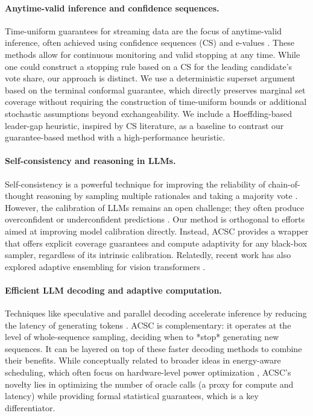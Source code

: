 \documentclass[11pt]{article}
\begin{document}
\paragraph{Anytime-valid inference and confidence sequences.}
Time-uniform guarantees for streaming data are the focus of anytime-valid inference, often achieved using confidence sequences (CS) and e-values \cite{howard2021time, waudbysmith2020confidence, grunwald2019safe}. These methods allow for continuous monitoring and valid stopping at any time. While one could construct a stopping rule based on a CS for the leading candidate's vote share, our approach is distinct. We use a deterministic superset argument based on the terminal conformal guarantee, which directly preserves marginal set coverage without requiring the construction of time-uniform bounds or additional stochastic assumptions beyond exchangeability. We include a Hoeffding-based leader-gap heuristic, inspired by CS literature, as a baseline to contrast our guarantee-based method with a high-performance heuristic.

\paragraph{Self-consistency and reasoning in LLMs.}
Self-consistency is a powerful technique for improving the reliability of chain-of-thought reasoning by sampling multiple rationales and taking a majority vote \cite{wang2023selfconsistency, kojima2022zeroshot}. However, the calibration of LLMs remains an open challenge; they often produce overconfident or underconfident predictions \cite{guo2017calibration, kadavath2022know, jain2024measuring, zhao2021calibrate}. Our method is orthogonal to efforts aimed at improving model calibration directly. Instead, ACSC provides a wrapper that offers explicit coverage guarantees and compute adaptivity for any black-box sampler, regardless of its intrinsic calibration. Relatedly, recent work has also explored adaptive ensembling for vision transformers \cite{bolya2022hydra}.

\paragraph{Efficient LLM decoding and adaptive computation.}
Techniques like speculative and parallel decoding accelerate inference by reducing the latency of generating tokens \cite{leviathan2023fast, chen2023medusa}. ACSC is complementary: it operates at the level of whole-sequence sampling, deciding when to *stop* generating new sequences. It can be layered on top of these faster decoding methods to combine their benefits. While conceptually related to broader ideas in energy-aware scheduling, which often focus on hardware-level power optimization \cite{valentini2007energy}, ACSC's novelty lies in optimizing the number of oracle calls (a proxy for compute and latency) while providing formal statistical guarantees, which is a key differentiator.
\end{document}
